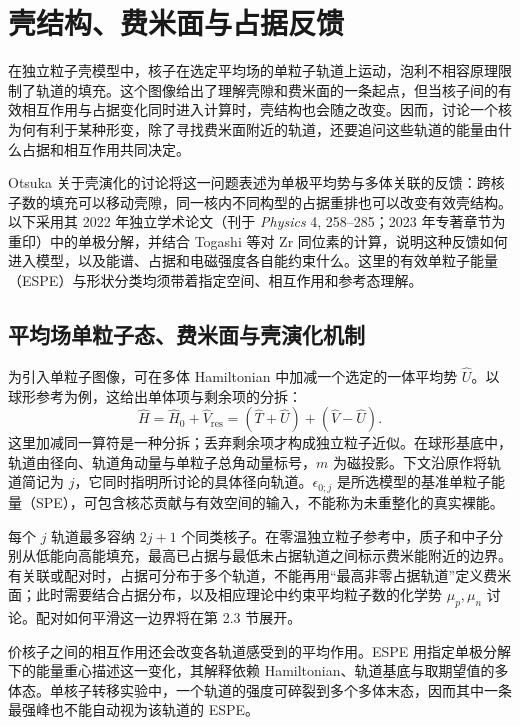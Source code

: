 \section{壳结构、费米面与占据反馈}\label{sec:2-2}


在独立粒子壳模型中，核子在选定平均场的单粒子轨道上运动，泡利不相容原理限制了轨道的填充。这个图像给出了理解壳隙和费米面的一条起点，但当核子间的有效相互作用与占据变化同时进入计算时，壳结构也会随之改变。因而，讨论一个核为何有利于某种形变，除了寻找费米面附近的轨道，还要追问这些轨道的能量由什么占据和相互作用共同决定。

Otsuka 关于壳演化的讨论将这一问题表述为单极平均势与多体关联的反馈：跨核子数的填充可以移动壳隙，同一核内不同构型的占据重排也可以改变有效壳结构。以下采用其 2022 年独立学术论文\cite{doctoral-r1-g28-otsuka-2023-type-ii-shell-evolution}（刊于 \textit{Physics} 4, 258--285；2023 年专著章节为重印）中的单极分解，并结合 Togashi 等对 Zr 同位素的计算\cite{doctoral-r1-g28-togashi-2016-zr-mcsm-qpt}，说明这种反馈如何进入模型，以及能谱、占据和电磁强度各自能约束什么。这里的有效单粒子能量（ESPE）与形状分类均须带着指定空间、相互作用和参考态理解。



\subsection{平均场单粒子态、费米面与壳演化机制}\label{sec:2-2-1}


为引入单粒子图像，可在多体 Hamiltonian 中加减一个选定的一体平均势 $\hat{U}$。以球形参考为例，这给出单体项与剩余项的分拆：
\begin{equation}\label{eq:2-2-1}
\hat{H} = \hat{H}_0 + \hat{V}_{\mathrm{res}} = (\hat{T} + \hat{U}) + (\hat{V} - \hat{U}).
\end{equation}
这里加减同一算符是一种分拆；丢弃剩余项才构成独立粒子近似。在球形基底中，轨道由径向、轨道角动量与单粒子总角动量标号，$m$ 为磁投影。下文沿原作将轨道简记为 $j$，它同时指明所讨论的具体径向轨道。$\epsilon_{0;j}$ 是所选模型的基准单粒子能量（SPE），可包含核芯贡献与有效空间的输入，不能称为未重整化的真实裸能。

每个 $j$ 轨道最多容纳 $2j+1$ 个同类核子。在零温独立粒子参考中，质子和中子分别从低能向高能填充，最高已占据与最低未占据轨道之间标示费米能附近的边界。有关联或配对时，占据可分布于多个轨道，不能再用“最高非零占据轨道”定义费米面；此时需要结合占据分布，以及相应理论中约束平均粒子数的化学势 $\mu_p,\mu_n$ 讨论。配对如何平滑这一边界将在第 2.3 节展开。

价核子之间的相互作用还会改变各轨道感受到的平均作用。ESPE 用指定单极分解下的能量重心描述这一变化，其解释依赖 Hamiltonian、轨道基底与取期望值的多体态。单核子转移实验中，一个轨道的强度可碎裂到多个多体末态，因而其中一条最强峰也不能自动视为该轨道的 ESPE。\cite{doctoral-r1-g28-otsuka-2023-type-ii-shell-evolution}

